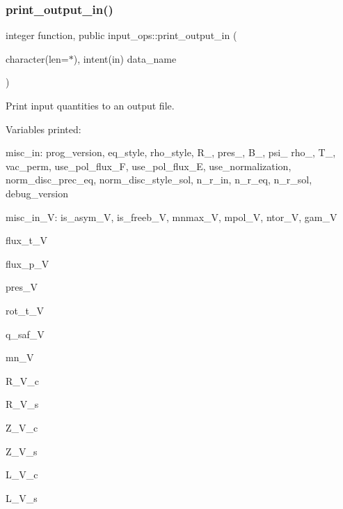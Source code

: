 \subsubsection{\texorpdfstring{print\+\_\+output\+\_\+in()}{print\_output\_in()}}
{\footnotesize\ttfamily integer function, public input\+\_\+ops\+::print\+\_\+output\+\_\+in (\begin{DoxyParamCaption}\item[{character(len=$\ast$), intent(in)}]{data\+\_\+name }\end{DoxyParamCaption})}



Print input quantities to an output file. 

Variables printed\+:
\begin{DoxyItemize}
\item {\ttfamily misc\+\_\+in\+:} {\ttfamily prog\+\_\+version}, {\ttfamily eq\+\_\+style}, {\ttfamily rho\+\_\+style}, {\ttfamily R\+\_}, {\ttfamily pres\+\_}, {\ttfamily B\+\_}, {\ttfamily psi\+\_} {\ttfamily rho\+\_}, {\ttfamily T\+\_}, {\ttfamily vac\+\_\+perm}, {\ttfamily use\+\_\+pol\+\_\+flux\+\_\+F}, {\ttfamily use\+\_\+pol\+\_\+flux\+\_\+E}, {\ttfamily use\+\_\+normalization}, {\ttfamily norm\+\_\+disc\+\_\+prec\+\_\+eq}, {\ttfamily norm\+\_\+disc\+\_\+style\+\_\+sol}, {\ttfamily n\+\_\+r\+\_\+in}, {\ttfamily n\+\_\+r\+\_\+eq}, {\ttfamily n\+\_\+r\+\_\+sol}, {\ttfamily debug\+\_\+version} 
\item {\ttfamily misc\+\_\+in\+\_\+V\+:} {\ttfamily is\+\_\+asym\+\_\+V}, {\ttfamily is\+\_\+freeb\+\_\+V}, {\ttfamily mnmax\+\_\+V}, {\ttfamily mpol\+\_\+V}, {\ttfamily ntor\+\_\+V}, {\ttfamily gam\+\_\+V} 
\item {\ttfamily flux\+\_\+t\+\_\+V} 
\item {\ttfamily flux\+\_\+p\+\_\+V} 
\item {\ttfamily pres\+\_\+V} 
\item {\ttfamily rot\+\_\+t\+\_\+V} 
\item {\ttfamily q\+\_\+saf\+\_\+V} 
\item {\ttfamily mn\+\_\+V} 
\item {\ttfamily R\+\_\+\+V\+\_\+c} 
\item {\ttfamily R\+\_\+\+V\+\_\+s} 
\item {\ttfamily Z\+\_\+\+V\+\_\+c} 
\item {\ttfamily Z\+\_\+\+V\+\_\+s} 
\item {\ttfamily L\+\_\+\+V\+\_\+c} 
\item {\ttfamily L\+\_\+\+V\+\_\+s} 

\end{DoxyItemize}
